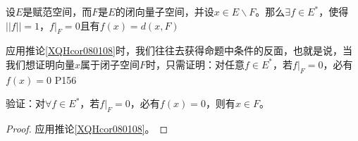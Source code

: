 \begin{corollary}\label{XQHcor080108}
	设$E$是赋范空间，而$F$是$E$的闭向量子空间，并设$x\in E \backslash F $。那么$\exists f\in E^{*} $，使得$||f||=1$，$f\big|_{F} = 0 $且有$f(x) =d(x,F) $
\end{corollary}

\original
{
	应用推论\ref{XQHcor080108}时，我们往往去获得命题中条件的反面，也就是说，当我们想证明向量$x$属于闭子空间$F$时，只需证明：对任意$f\in E^{*} $，若$f\big|_{F}=0 $，必有$f(x)=0 $
}
{P156}

\begin{proposition}
	验证：对$\forall f\in E^{*} $，若$f\big|_{F}=0 $，必有$f(x)=0 $，则有$x\in F $。
\end{proposition}

\begin{proof}
	应用推论\ref{XQHcor080108}。
\end{proof}











